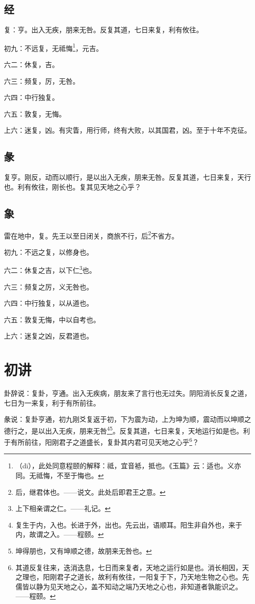 \documentclass[12pt,oneside]{book}
\begin{document}
\subsection{经}
复：亨。出入无疾，朋来无咎。反复其道，七日来复，利有攸往。

初九：不远复，无祗悔\footnote{（dī），此处同意程颐的解释：祗，宜音袛，抵也。《玉篇》云：适也。义亦同。无祗悔，不至于悔也。 }，元吉。

六二：休复，吉。

六三：频复，厉，无咎。

六四：中行独复。

六五：敦复，无悔。

上六：迷复，凶。有灾眚，用行师，终有大败，以其国君，凶。至于十年不克征。

\subsection{彖}
复亨。刚反，动而以顺行，是以出入无疾，朋来无咎。反复其道，七日来复，天行也。利有攸往，刚长也。复其见天地之心乎？

\subsection{象}
雷在地中，复。先王以至日闭关，商旅不行，后\footnote{后，继君体也。——说文。此处后即君王之意。}不省方。

初九：不远之复，以修身也。

六二：休复之吉，以下仁\footnote{上下相亲谓之仁。——礼记。}也。

六三：频复之厉，义无咎也。

六四：中行独复，以从道也。

六五：敦复无悔，中以自考也。

上六：迷复之凶，反君道也。

\section{初讲}
卦辞说：复卦，亨通。出入无疾病，朋友来了言行也无过失。阴阳消长反复之道，七日为一来复，利于有所前往。

彖说：复卦亨通，初九刚爻复返于初，下为震为动，上为坤为顺，震动而以坤顺之德行之，是以出入无疾，朋来无咎\footnote{复生于内，入也。长进于外，出也。先云出，语顺耳。阳生非自外也，来于内，故谓之入。——程颐。}\footnote{坤得朋也，又有坤顺之德，故朋来无咎也。}。反复其道，七日来复，天地运行如是也。利于有所前往，阳刚君子之道盛长，复卦其内君可见天地之心乎\footnote{其道反复往来，迭消迭息，七日而来复者，天地之运行如是也。消长相因，天之理也，阳刚君子之道长，故利有攸往，一阳复于下，乃天地生物之心也。先儒皆以静为见天地之心，盖不知动之端乃天地之心也，非知道者孰能识之。——程颐。}？
\end{document}
